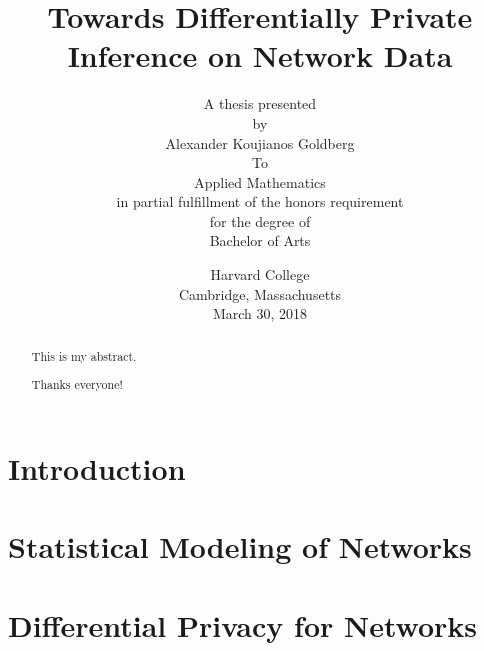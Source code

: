 \documentclass[12pt]{report}
\title{
	\textbf{Towards Differentially Private Inference on Network Data} \\[1.5em]
	}
\author{ 
				A thesis presented  \\[0.1em]
				by\\[1.25em]
				\Large{Alexander Koujianos Goldberg} \\[1.25em]
				To\\[0.1em]
				Applied Mathematics\\[0.1em]
				in partial fulfillment of the honors requirement\\[0.1em]
				for the degree of\\[0.1em]
				Bachelor of Arts
			}
\date{Harvard College\\[0.1em]
	Cambridge, Massachusetts\\[0.1em]
	March 30, 2018}
\begin{document}
	
	\maketitle 
	
	\begin{abstract}
		This is my abstract.
	\end{abstract}

	\renewcommand\abstractname{Acknowledgements}
	\begin{abstract}
		Thanks everyone!
	\end{abstract}
	
	\tableofcontents
	
	\chapter{Introduction}\label{ch:intro}
	\setcounter{page}{1}
	
	
	
	\chapter[Statistical Modeling of Networks]{Statistical Modeling of Networks}
	\label{ch:network_modeling}
	
	
	
	\chapter{Differential Privacy for Networks}\label{ch:dp_defns}
	
	
	
	
\end{document}
